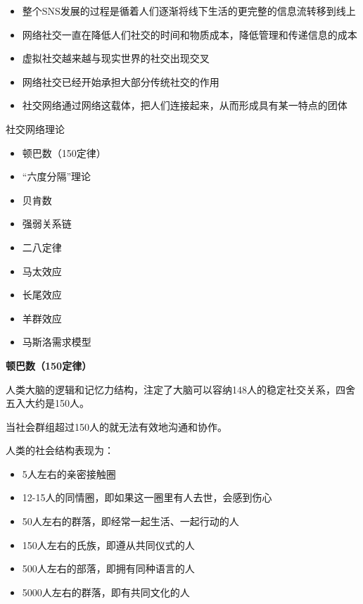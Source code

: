 \begin{frame}

	\begin{itemize}
		\item 整个SNS发展的过程是循着人们逐渐将线下生活的更完整的信息流转移到线上
		\item 网络社交一直在降低人们社交的时间和物质成本，降低管理和传递信息的成本
		\item 虚拟社交越来越与现实世界的社交出现交叉
		\item 网络社交已经开始承担大部分传统社交的作用
		\item 社交网络通过网络这载体，把人们连接起来，从而形成具有某一特点的团体
	\end{itemize}

\end{frame}

\begin{frame}
	社交网络理论
	\begin{itemize}
		\item 顿巴数（150定律）
		\item “六度分隔”理论
		\item 贝肯数
		\item 强弱关系链
		\item 二八定律
		\item 马太效应
		\item 长尾效应
		\item 羊群效应
		\item 马斯洛需求模型
	\end{itemize}

\end{frame}

\begin{frame}
	\textbf{顿巴数（150定律）}
	
	人类大脑的逻辑和记忆力结构，注定了大脑可以容纳148人的稳定社交关系，四舍五入大约是150人。
	
	当社会群组超过150人的就无法有效地沟通和协作。
	
	人类的社会结构表现为：
	\begin{itemize}
		\item 5人左右的亲密接触圈
		\item 12-15人的同情圈，即如果这一圈里有人去世，会感到伤心
		\item 50人左右的群落，即经常一起生活、一起行动的人
		\item 150人左右的氏族，即遵从共同仪式的人
		\item 500人左右的部落，即拥有同种语言的人
		\item 5000人左右的群落，即有共同文化的人
	\end{itemize}

\end{frame}

